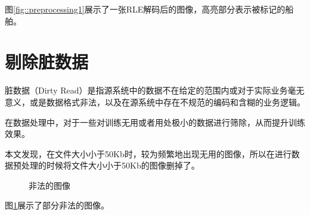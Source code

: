 图\ref{fig::preprocessing1}展示了一张RLE解码后的图像，高亮部分表示被标记的船舶。

\section{剔除脏数据}

脏数据（Dirty
Read）是指源系统中的数据不在给定的范围内或对于实际业务毫无意义，或是数据格式非法，以及在源系统中存在不规范的编码和含糊的业务逻辑。

在数据处理中，对于一些对训练无用或者用处极小的数据进行筛除，从而提升训练效果。

本文发现，在文件大小小于50Kb时，较为频繁地出现无用的图像，所以在进行数据预处理的时候将文件大小小于50Kb的图像删掉了。

\begin{figure}[htbp]
    \centering
    \caption{非法的图像}
	\label{fig::preprocessing2}
\end{figure}

图\ref{fig::preprocessing2}展示了部分非法的图像。

